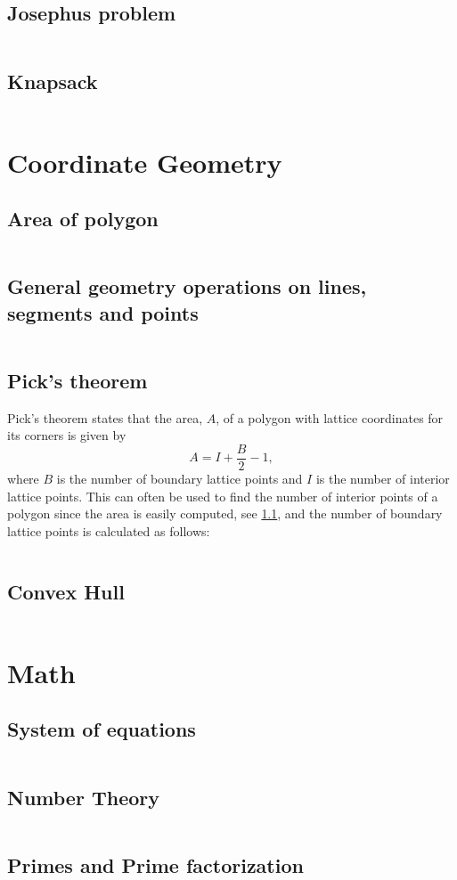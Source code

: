\documentclass[8pt,a4paper,landscape,oneside]{amsart}
\newcommand{\codep}[1]{\inputminted[fontsize=\large,tabsize=2,baselinestretch=1]{py}{code/#1}}
\begin{document}
\begin{multicols*}{2}
\begin{large}
\subsection{Josephus problem}
\codep{josephus.py}
\subsection{Knapsack}
\codep{knapsack.py}
\section{Coordinate Geometry}
\subsection{Area of polygon}\label{sec: polyarea}
\codep{polygonArea.py}
\subsection{General geometry operations on lines, segments and points}
\codep{geometry.py}
\subsection{Pick's theorem}
Pick's theorem states that the area, $A$, of a polygon with lattice coordinates for its corners is given by $$A=I+\frac{B}{2}-1,$$ where $B$ is the number of boundary lattice points and $I$ is the number of interior lattice points. This can often be used to find the number of interior points of a polygon since the area is easily computed, see \ref{sec: polyarea}, and the number of boundary lattice points is calculated as follows:
\codep{boundarypoints.py}
\subsection{Convex Hull}
\codep{convexhull.py}
\section{Math}
\subsection{System of equations}
\codep{gaussianelimination.py}
\subsection{Number Theory}
\codep{gcdbezout.py}
\subsection{Primes and Prime factorization}
\codep{primecalc.py}

\end{large}
\end{multicols*}
\end{document}
